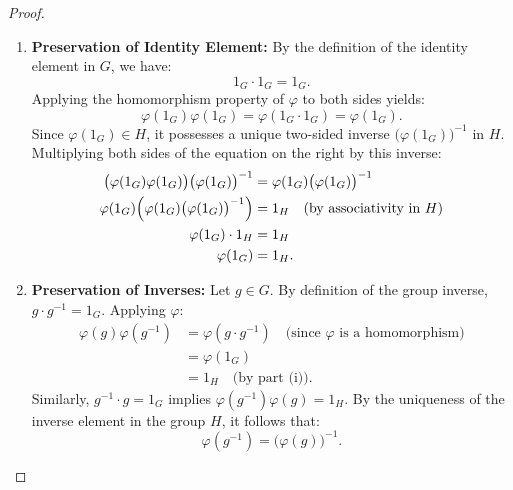 \begin{proof}
\begin{enumerate}[label=\textbf{(\roman*)}, leftmargin=*, itemsep=8pt]
    \item \textbf{Preservation of Identity Element:}
    By the definition of the identity element in $G$, we have:
    \begin{equation*}
    1_G \cdot 1_G = 1_G.
    \end{equation*}
    Applying the homomorphism property of $\varphi$ to both sides yields:
    \begin{equation*}
    \varphi(1_G)\varphi(1_G) = \varphi(1_G \cdot 1_G) = \varphi(1_G).
    \end{equation*}
    Since $\varphi(1_G) \in H$, it possesses a unique two-sided inverse $\bigl(\varphi(1_G)\bigr)^{-1}$ in $H$. Multiplying both sides of the equation on the right by this inverse:
    \begin{align*}
    \bigl(\varphi(1_G)\varphi(1_G)\bigr)\bigl(\varphi(1_G)\bigr)^{-1} &= \varphi(1_G)\bigl(\varphi(1_G)\bigr)^{-1} \\
    \varphi(1_G)\Bigl(\varphi(1_G)\bigl(\varphi(1_G)\bigr)^{-1}\Bigr) &= 1_H \quad \text{(by associativity in $H$)} \\
    \varphi(1_G) \cdot 1_H &= 1_H \\
    \varphi(1_G) &= 1_H.
    \end{align*}

    \item \textbf{Preservation of Inverses:}
    Let $g \in G$. By definition of the group inverse, $g \cdot g^{-1} = 1_G$. Applying $\varphi$:
    \begin{align*}
    \varphi(g)\varphi(g^{-1}) &= \varphi(g \cdot g^{-1}) \quad \text{(since $\varphi$ is a homomorphism)} \\
    &= \varphi(1_G) \\
    &= 1_H \quad \text{(by part (i))}.
    \end{align*}
    Similarly, $g^{-1} \cdot g = 1_G$ implies $\varphi(g^{-1})\varphi(g) = 1_H$.
    By the uniqueness of the inverse element in the group $H$, it follows that:
    \begin{equation*}
    \varphi(g^{-1}) = \bigl(\varphi(g)\bigr)^{-1}.
    \end{equation*}


\end{enumerate}
\end{proof}
